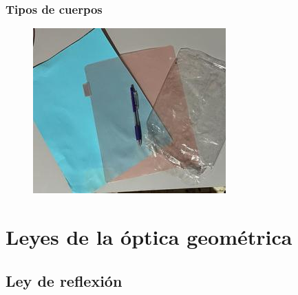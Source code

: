 \documentclass[14pt]{beamer}
\begin{document}
\begin{frame}
\frametitle{Tipos de cuerpos}
\begin{figure}
    \centering
    \includegraphics[scale=0.5]{Imagenes/Cuerpos_Luz_01.jpg}
\end{figure}
\end{frame}

\section{Leyes de la óptica geométrica}
\subsection{Ley de reflexión}
\end{document}

